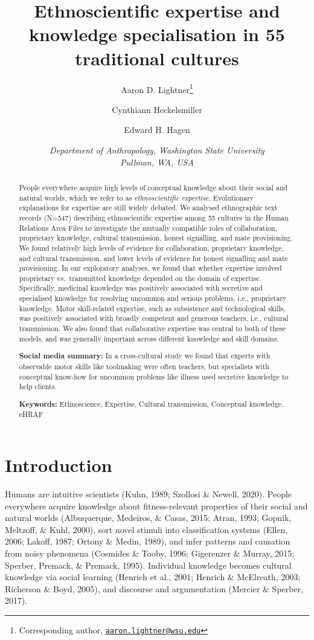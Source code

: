 \documentclass[
  11pt,
]{article}
\title{\LARGE \textbf{Ethnoscientific expertise and knowledge specialisation in 55 traditional cultures}}
\author{Aaron D. Lightner\footnote{Corresponding author, \href{mailto:aaron.lightner@wsu.edu}{\nolinkurl{aaron.lightner@wsu.edu}}} \and Cynthiann Heckelsmiller \and Edward H. Hagen}
\date{\emph{Department of Anthropology, Washington State University\\Pullman, WA, USA}}
\begin{document}
\maketitle
\begin{abstract}
People everywhere acquire high levels of conceptual knowledge about their social and natural worlds, which we refer to as \emph{ethnoscientific expertise}. Evolutionary explanations for expertise are still widely debated. We analysed ethnographic text records (N=547) describing ethnoscientific expertise among 55 cultures in the Human Relations Area Files to investigate the mutually compatible roles of collaboration, proprietary knowledge, cultural transmission, honest signalling, and mate provisioning. We found relatively high levels of evidence for collaboration, proprietary knowledge, and cultural transmission, and lower levels of evidence for honest signalling and mate provisioning. In our exploratory analyses, we found that whether expertise involved proprietary vs.~transmitted knowledge depended on the domain of expertise. Specifically, medicinal knowledge was positively associated with secretive and specialised knowledge for resolving uncommon and serious problems, i.e., proprietary knowledge. Motor skill-related expertise, such as subsistence and technological skills, was positively associated with broadly competent and generous teachers, i.e., cultural transmission. We also found that collaborative expertise was central to both of these models, and was generally important across different knowledge and skill domains.

\textbf{Social media summary:} In a cross-cultural study we found that experts with observable motor skills like toolmaking were often teachers, but specialists with conceptual know-how for uncommon problems like illness used secretive knowledge to help clients.

\textbf{Keywords:} Ethnoscience, Expertise, Cultural transmission, Conceptual knowledge, eHRAF
\end{abstract}


\newpage


\hypertarget{introduction}{%
\section{Introduction}\label{introduction}}

Humans are intuitive scientists (Kuhn, 1989; Szollosi \& Newell, 2020). People everywhere acquire knowledge about fitness-relevant properties of their social and natural worlds (Albuquerque, Medeiros, \& Casas, 2015; Atran, 1993; Gopnik, Meltzoff, \& Kuhl, 2000), sort novel stimuli into classification systems (Ellen, 2006; Lakoff, 1987; Ortony \& Medin, 1989), and infer patterns and causation from noisy phenomena (Cosmides \& Tooby, 1996; Gigerenzer \& Murray, 2015; Sperber, Premack, \& Premack, 1995). Individual knowledge becomes cultural knowledge via social learning (Henrich et al., 2001; Henrich \& McElreath, 2003; Richerson \& Boyd, 2005), and discourse and argumentation (Mercier \& Sperber, 2017).
\end{document}
